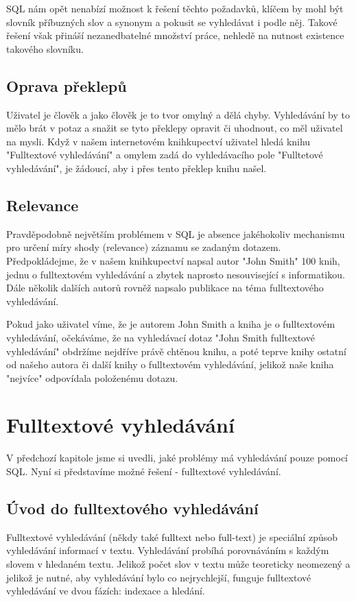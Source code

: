 \documentclass[11pt,draft,oneside]{fithesis2}
\begin{document}
SQL nám opět nenabízí možnost k řešení těchto požadavků, klíčem by mohl být slovník příbuzných slov a synonym a pokusit se vyhledávat i podle něj. Takové řešení však přináší nezanedbatelné množství práce, nehledě na nutnost existence takového slovníku.

\subsection{Oprava překlepů}
Uživatel je člověk a jako člověk je to tvor omylný a dělá chyby. Vyhledávání by to mělo brát v potaz a snažit se tyto překlepy opravit či uhodnout, co měl uživatel na mysli. Když v našem internetovém knihkupectví uživatel hledá knihu "Fulltextové vyhledávání" a
omylem zadá do vyhledávacího pole "Fulltetové vyhledávání", je žádoucí, aby i přes tento překlep knihu našel.

\subsection{Relevance}
Pravděpodobně největším problémem v SQL je absence jakéhokoliv mechanismu pro určení míry shody (relevance) záznamu se zadaným dotazem. Předpokládejme, že v našem knihkupectví napsal autor "John Smith" 100 knih, jednu o fulltextovém vyhledávání a 
zbytek naprosto nesouvisející s informatikou. Dále několik dalších autorů rovněž napsalo publikace na téma fulltextového vyhledávání.

Pokud jako uživatel víme, že je autorem John Smith a kniha je o fulltextovém vyhledávání, očekáváme, že na vyhledávací dotaz "John Smith fulltextové vyhledávání" obdržíme nejdříve právě chtěnou knihu, a poté teprve knihy ostatní od našeho autora či
další knihy o fulltextovém vyhledávání, jelikož naše kniha "nejvíce" odpovídala položenému dotazu.


\section{Fulltextové vyhledávání}
V předchozí kapitole jsme si uvedli, jaké problémy má vyhledávání pouze pomocí SQL. Nyní si představíme možné řešení - fulltextové vyhledávání. 

\subsection{Úvod do fulltextového vyhledávání}
Fulltextové vyhledávání (někdy také fulltext nebo full-text) je speciální způsob vyhledávání informací v textu. Vyhledávání probíhá porovnáváním s každým slovem v hledaném textu. Jelikož počet slov v textu může teoreticky neomezený a jelikož je 
nutné, aby vyhledávání bylo co nejrychlejší, funguje fulltextové vyhledávání ve dvou fázích: indexace a hledání. 
\end{document}
